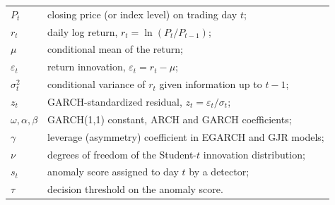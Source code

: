 \noindent
\begin{tabular}{p{3.0cm}p{10.0cm}}

$P_t$			&closing price (or index level) on trading day $t$;\\
$r_t$			&daily log return, $r_t = \ln(P_t / P_{t-1})$;\\
$\mu$			&conditional mean of the return;\\
$\varepsilon_t$	&return innovation, $\varepsilon_t = r_t - \mu$;\\
$\sigma_t^2$	&conditional variance of $r_t$ given information up to $t-1$;\\
$z_t$			&GARCH-standardized residual, $z_t = \varepsilon_t / \sigma_t$;\\
$\omega, \alpha, \beta$	&GARCH(1,1) constant, ARCH and GARCH coefficients;\\
$\gamma$		&leverage (asymmetry) coefficient in EGARCH and GJR models;\\
$\nu$			&degrees of freedom of the Student-$t$ innovation distribution;\\
$s_t$			&anomaly score assigned to day $t$ by a detector;\\
$\tau$			&decision threshold on the anomaly score.\\

\end{tabular}
